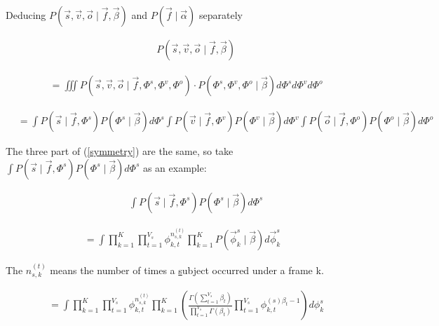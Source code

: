 \documentclass{article}
\begin{document}
\noindent Deducing $P(\vec{s}, \vec{v}, \vec{o} \mid \vec{f}, \vec{\beta})$ and $P(\vec{f} \mid \vec{\alpha})$ separately

\begin{equation}
\begin{aligned}
& \qquad P(\vec{s}, \vec{v}, \vec{o} \mid \vec{f}, \vec{\beta})
\end{aligned}
\end{equation}


\begin{equation}
\begin{aligned}
&= \iiint P(\vec{s}, \vec{v}, \vec{o} \mid \vec{f}, \Phi^s, \Phi^v, \Phi^o) 
\cdot P(\Phi^s, \Phi^v, \Phi^o \mid \vec{\beta}) d\Phi^s d\Phi^v d\Phi^o
\end{aligned}
\end{equation}


\begin{equation}
\begin{aligned} \label{symmetry}
&= \int P(\vec{s} \mid \vec{f}, \Phi^s) P(\Phi^s \mid \vec{\beta}) d\Phi^s
\int P(\vec{v} \mid \vec{f}, \Phi^v) P(\Phi^v \mid \vec{\beta}) d\Phi^v
\int P(\vec{o} \mid \vec{f}, \Phi^o) P(\Phi^o \mid \vec{\beta}) d\Phi^o
\end{aligned}
\end{equation}

\noindent The three part of (\ref{symmetry}) are the same, so take $\int P(\vec{s} \mid \vec{f}, \Phi^s) P(\Phi^s \mid \vec{\beta}) d\Phi^s$ as an example:

\begin{equation}
\begin{aligned} 
& \qquad \int P(\vec{s} \mid \vec{f}, \Phi^s) P(\Phi^s \mid \vec{\beta}) d\Phi^s
\end{aligned}
\end{equation}


\begin{equation}
\begin{aligned} 
= \int \prod_{k=1}^{K}{ \prod_{t=1}^{V_s} { 
 \phi_{k,t}^{n_{s,k}^{(t)}}  
 \prod_{k=1}^{K}P(\vec{\phi}_k^s \mid \vec{\beta})d\vec{\phi}_k^s}}
\end{aligned}
\end{equation}

The $n_{s,k}^{(t)}$ means the number of times a \underline{s}ubject occurred under a  frame k.


\begin{equation}
\begin{aligned}
&= \int \prod_{k=1}^{K}{ \prod_{t=1}^{V_s} { \phi_{k,t}^{n_{s,k}^{(t)}} 
\prod_{k=1}^{K} \left( \frac{\varGamma(\sum_{t=1}^{V_s} \beta_t)}{\prod_{t=1}^{V_s}\varGamma(\beta_t)} \prod_{t=1}^{V_s}\phi_{k,t}^{(s)\beta_t -1}  \right)
d\phi_k^s}}
\end{aligned}
\end{equation}
\end{document}
